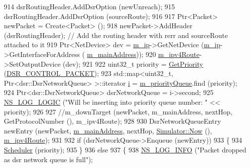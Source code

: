 \begin{DoxyCode}
914                   dsrRoutingHeader.AddDsrOption (newUnreach);
915                   dsrRoutingHeader.AddDsrOption (sourceRoute);
916 
917                   Ptr<Packet> newPacket = Create<Packet> ();
918                   newPacket->AddHeader (dsrRoutingHeader); \textcolor{comment}{// Add the routing header with rerr and
       sourceRoute attached to it}
919                   Ptr<NetDevice> dev = \hyperlink{classns3_1_1dsr_1_1DsrRouting_a0443d48172143cafa1d0491e35f3fbaf}{m\_ip}->GetNetDevice (\hyperlink{classns3_1_1dsr_1_1DsrRouting_a0443d48172143cafa1d0491e35f3fbaf}{m\_ip}->GetInterfaceForAddress (
      \hyperlink{classns3_1_1dsr_1_1DsrRouting_a73182b5edee2d8460f28855e058fc9a0}{m\_mainAddress}));
920                   \hyperlink{classns3_1_1dsr_1_1DsrRouting_ab4c16d56044159989e52ad33c0afed2b}{m\_ipv4Route}->SetOutputDevice (dev);
921 
922                   uint32\_t priority = \hyperlink{classns3_1_1dsr_1_1DsrRouting_a67d111b0188b6e2210d1b4782820f8e3}{GetPriority} (\hyperlink{namespacens3_1_1dsr_a7c80bcec67d78dc149a0e503014d07c5abeaa53bf31d961c221e4e377ef6022f2}{DSR\_CONTROL\_PACKET}); 
923                   std::map<uint32\_t, Ptr<dsr::DsrNetworkQueue> >::iterator \hyperlink{bernuolliDistribution_8m_a6f6ccfcf58b31cb6412107d9d5281426}{i} = 
      \hyperlink{classns3_1_1dsr_1_1DsrRouting_a4606c3dfb1099afbfe1e7cd1d1c3c8ee}{m\_priorityQueue}.find (priority);
924                   Ptr<dsr::DsrNetworkQueue> dsrNetworkQueue = i->second;
925                   \hyperlink{group__logging_ga88acd260151caf2db9c0fc84997f45ce}{NS\_LOG\_LOGIC} (\textcolor{stringliteral}{"Will be inserting into priority queue number: "} << priority);
926 
927                   \textcolor{comment}{//m\_downTarget (newPacket, m\_mainAddress, nextHop, GetProtocolNumber (), m\_ipv4Route);}
928 
930                  DsrNetworkQueueEntry newEntry (newPacket, \hyperlink{classns3_1_1dsr_1_1DsrRouting_a73182b5edee2d8460f28855e058fc9a0}{m\_mainAddress}, nextHop, 
      \hyperlink{classns3_1_1Simulator_ac3178fa975b419f7875e7105be122800}{Simulator::Now} (), \hyperlink{classns3_1_1dsr_1_1DsrRouting_ab4c16d56044159989e52ad33c0afed2b}{m\_ipv4Route});
931 
932                  \textcolor{keywordflow}{if} (dsrNetworkQueue->Enqueue (newEntry))
933                    \{
934                      \hyperlink{classns3_1_1dsr_1_1DsrRouting_aa518edb174bccce1062304404424c6e0}{Scheduler} (priority);
935                    \}
936                  \textcolor{keywordflow}{else}
937                    \{
938                      \hyperlink{group__logging_gafbd73ee2cf9f26b319f49086d8e860fb}{NS\_LOG\_INFO} (\textcolor{stringliteral}{"Packet dropped as dsr network queue is full"});

\end{DoxyCode}
